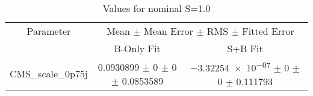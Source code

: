 \begin{table}
\centering
\caption{Values for nominal S=1.0}
\begin{tabular}{ccc}
\toprule
Parameter & \multicolumn{2}{c}{Mean $\pm$ Mean Error $\pm$ RMS $\pm$ Fitted Error}\\
 & B-Only Fit & S+B Fit\\
\midrule
CMS\_scale\_0p75j & \num{0.0930899} $\pm$ \num{0} $\pm$ \num{0} $\pm$ \num{0.0853589} & \num{-3.32254e-07} $\pm$ \num{0} $\pm$ \num{0} $\pm$ \num{0.111793}\\
\bottomrule
\end{tabular}
\end{table}